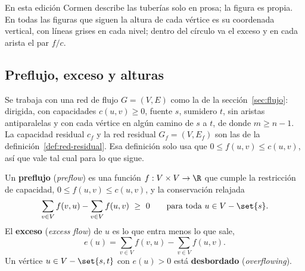 \documentclass[11pt,letterpaper]{article}
\begin{document}
\begin{ejemplo}
\begin{center}
  \end{center}
  En esta edición Cormen describe las tuberías solo en prosa; la
  figura es propia. En todas las figuras que siguen la altura de cada
  vértice es su coordenada vertical, con líneas grises en cada nivel;
  dentro del círculo va el exceso y en cada arista el par $f/c$.
\end{ejemplo}


\subsection*{Preflujo, exceso y alturas}

Se trabaja con una red de flujo $G = (V, E)$ como la de la
sección~\ref{sec:flujo}: dirigida, con capacidades $c(u, v) \ge 0$,
fuente $s$, sumidero $t$, sin aristas antiparalelas y con cada vértice
en algún camino de $s$ a $t$, de donde $m \ge n - 1$. La capacidad
residual $c_f$ y la red residual $G_f = (V, E_f)$ son las de la
definición~\ref{def:red-residual}. Esa definición solo usa que
$0 \le f(u, v) \le c(u, v)$, así que vale tal cual para lo que sigue.

\begin{definicion}[Preflujo]
  \label{def:preflujo}
  Un \textbf{preflujo} (\textit{preflow}) es una función
  $f : V \times V \to \R$ que cumple la restricción de capacidad,
  $0 \le f(u, v) \le c(u, v)$, y la conservación relajada
  \[
    \sum_{v \in V} f(v, u) - \sum_{v \in V} f(u, v) \ \ge\ 0
    \qquad \text{para toda } u \in V - \set{s} .
  \]
  El \textbf{exceso} (\textit{excess flow}) de $u$ es lo que entra
  menos lo que sale,
  \[
    e(u) = \sum_{v \in V} f(v, u) - \sum_{v \in V} f(u, v) .
  \]
  Un vértice $u \in V - \set{s, t}$ con $e(u) > 0$ está
  \textbf{desbordado} (\textit{overflowing}).
\end{definicion}
\end{document}
